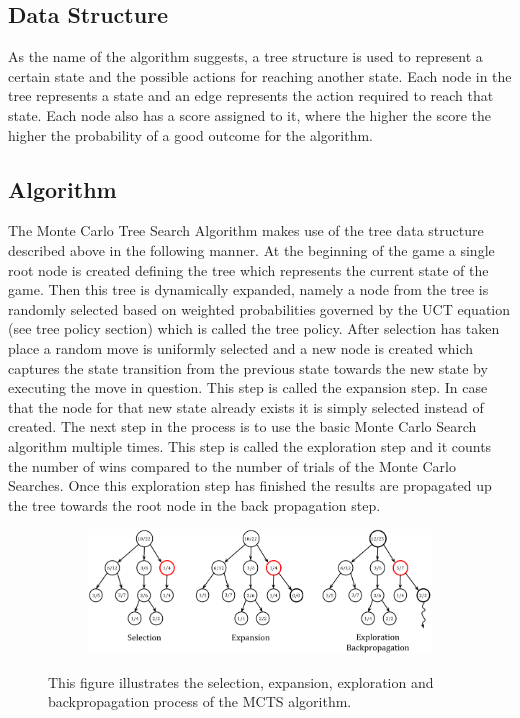 \documentclass[compressed,final,notitlepage,narroweqnarray,inline,twoside,]{ieee}
\begin{document}
\subsection{Data Structure}
As the name of the algorithm suggests, a tree structure is used to represent a certain state and the possible actions for reaching another state. Each node in the tree represents a state and an edge represents the action required to reach that state. Each node also has a score assigned to it, where the higher the score the higher the probability of a good outcome for the algorithm.

\subsection{Algorithm}
The Monte Carlo Tree Search Algorithm makes use of the tree data structure described above in the following manner. At the beginning of the game a single root node is created defining the tree which represents the current state of the game. Then this tree is dynamically expanded, namely a node from the tree is randomly selected based on weighted probabilities governed by the UCT equation (see tree policy section) which is called the tree policy. After selection has taken place a random move is uniformly selected and a new node is created which captures the state transition from the previous state towards the new state by executing the move in question. This step is called the expansion step. In case that the node for that new state already exists it is simply selected instead of created. The next step in the process is to use the basic Monte Carlo Search algorithm multiple times. This step is called the exploration step and it counts the number of wins compared to the number of trials of the Monte Carlo Searches. Once this exploration step has finished the results are propagated up the tree towards the root node in the back propagation step.
\begin{figure}[ht]
        \centering
        \begin{subfigure}[b]{1\textwidth}
                \includegraphics[width=\textwidth]{../images/mcts_algorithm}
        \end{subfigure}
        \vspace{-10pt}
        \caption{ This figure illustrates the selection, expansion, exploration and backpropagation process of the MCTS algorithm.}
        
        \label{fig:1}
\end{figure}
\end{document}
